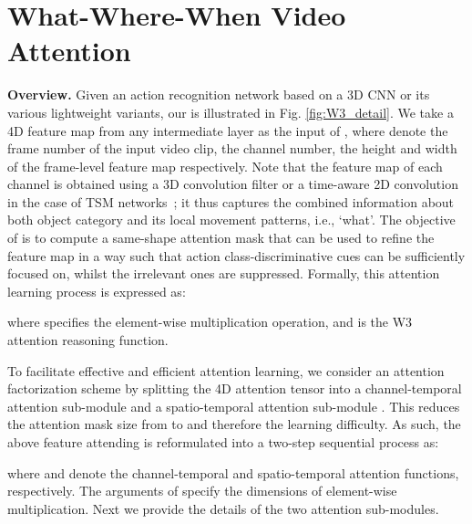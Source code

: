 \documentclass[runningheads]{llncs}
\newcommand{\keypoint}[1]{\vspace{0.1cm}\noindent\textbf{#1}\quad}
\begin{document}
\section{ What-Where-When Video Attention}


\keypoint{Overview.}
Given an action recognition network based on a 3D CNN or its various lightweight variants, our \shortname{} is illustrated in Fig. \ref{fig:W3_detail}. We take a 4D feature map  from any intermediate layer as the input of \shortname{}, 
where  denote the frame number of the input video clip, the channel number, the height and width of the frame-level feature map respectively. 
Note that the feature map of each channel is obtained using a 3D convolution filter or a time-aware 2D convolution in the case of TSM networks~\cite{zhou2018temporal}; it thus captures the combined information about both object category and its local movement patterns, i.e., `what'. 
The objective of \shortname{} is to compute a same-shape attention mask  that can be used to refine the feature map in a way such that action class-discriminative cues can be sufficiently focused on, whilst the irrelevant ones are suppressed.
Formally, this attention learning process is expressed as:

where  specifies the element-wise multiplication operation, and  is the W3 attention reasoning function. 

To facilitate effective and efficient attention learning, 
we consider an attention factorization scheme
by splitting the 4D attention tensor  into
a channel-temporal attention sub-module 
and 
a spatio-temporal attention sub-module .
This reduces the attention mask size from  to  and therefore
the learning difficulty.
As such, the above feature attending is reformulated into a two-step sequential process as:

where  and  denote the channel-temporal and spatio-temporal attention functions, respectively.
The arguments of  specify the dimensions of element-wise multiplication.
Next we provide the details of the two attention sub-modules.
\end{document}
